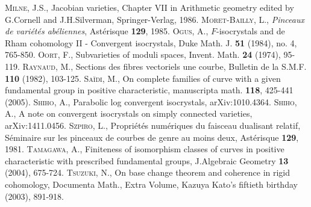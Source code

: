 \documentclass[11pt]{amsart}
\begin{document}
\begin{thebibliography}{99}
 \textsc{Milne, J.S.}, Jacobian varieties, Chapter VII in Arithmetic geometry edited by G.Cornell and J.H.Silverman, 
Springer-Verlag, 1986. 
\textsc{Moret-Bailly, L.}, {\it Pinceaux de vari\'et\'es ab\'eliennes}, Ast\'erisque \textbf{129}, 1985.
\textsc{Ogus, A.}, $F$-isocrystals and de Rham cohomology II - Convergent isocrystals,  Duke Math. J. \textbf{51} 
(1984), no. 4, 765-850.
\textsc{Oort, F.}, Subvarieties of moduli spaces, Invent. Math. \textbf{24} (1974), 95-119.
\textsc{Raynaud, M.}, Sections des fibres vectoriels une courbe, Bulletin de la S.M.F. \textbf{110} (1982), 103-125. 
\textsc{Sa\"idi, M.}, On complete families of curve with a given fundamental group in positive characteristic, 
manuscripta math. {\bf 118}, 425-441 (2005). 
 \textsc{Shiho, A.}, 
Parabolic log convergent isocrystals, arXiv:1010.4364.
 \textsc{Shiho, A.}, A note on convergent isocrystals on simply connected varieties, arXiv:1411.0456.
\textsc{Szpiro, L.}, Propri\'et\'es num\'eriques du faisceau dualisant relatif, S\'eminaire 
sur les pinceaux de courbes de genre au moins deux, Ast\'erisque \textbf{129}, 1981.
\textsc{Tamagawa, A.}, Finiteness of isomorphism classes of curves in positive characteristic with prescribed fundamental groups, 
J.Algebraic Geometry \textbf{13} (2004), 675-724. 
\textsc{Tsuzuki, N.}, On base change theorem and coherence in rigid cohomology, Documenta Math., Extra Volume,
Kazuya Kato's fiftieth birthday (2003), 891-918.
\end{thebibliography}
\end{document}
